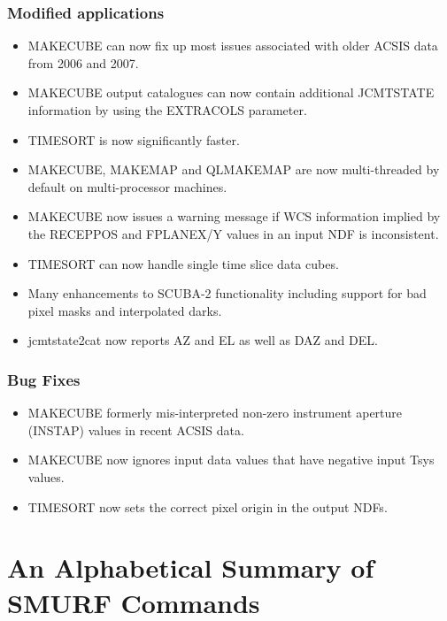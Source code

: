 \documentclass[oneside,11pt]{starlink}
\begin{document}
\subsubsection*{Modified applications}
\begin{itemize}
  \item MAKECUBE can now fix up most issues associated with older ACSIS data from 2006 and 2007.
  \item MAKECUBE output catalogues can now contain additional JCMTSTATE information by using the EXTRACOLS parameter.
  \item TIMESORT is now significantly faster.
  \item MAKECUBE, MAKEMAP and QLMAKEMAP are now multi-threaded by default on multi-processor machines.
  \item MAKECUBE now issues a warning message if WCS information implied by the RECEPPOS and FPLANEX/Y values in an input NDF is inconsistent.
  \item TIMESORT can now handle single time slice data cubes.
  \item Many enhancements to SCUBA-2 functionality including support for bad pixel masks and interpolated darks.
 \item jcmtstate2cat now reports AZ and EL as well as DAZ and DEL.
\end{itemize}

\subsubsection*{Bug Fixes}

\begin{itemize}
\item MAKECUBE formerly mis-interpreted non-zero instrument aperture (INSTAP) values in recent ACSIS data.
\item MAKECUBE now ignores input data values that have negative input Tsys values.
\item TIMESORT now sets the correct pixel origin in the output NDFs.
\end{itemize}

\newpage

\appendix

\section{An Alphabetical Summary of SMURF Commands
\label{ap:summary}}
\end{document}
